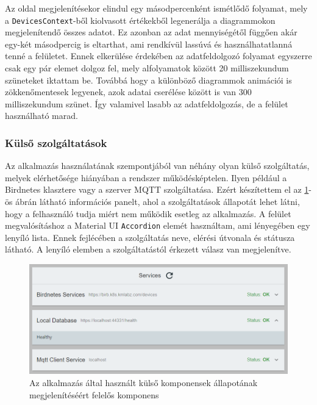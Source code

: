 Az oldal megjelenítésekor elindul egy másodpercenként ismétlődő folyamat,
mely a \verb+DevicesContext+-ből kiolvasott értékekből legenerálja a diagrammokon megjelenítendő összes adatot.
Ez azonban az adat mennyiségétől függően akár egy-két másodpercig is eltarthat, ami rendkívül lassúvá és használhatatlanná tenné a felületet.
Ennek elkerülése érdekében az adatfeldolgozó folyamat egyszerre csak egy pár elemet dolgoz fel, mely alfolyamatok között 20 milliszekundum szüneteket iktattam be.
Továbbá hogy a különböző diagrammok animációi is zökkenőmentesek legyenek, azok adatai cserélése között is van 300 milliszekundum szünet.
Így valamivel lasabb az adatfeldolgozás, de a felület használható marad.
\subsubsection{Külső szolgáltatások}
Az alkalmazás használatának szempontjából van néhány olyan külső szolgáltatás, melyek elérhetősége hiányában a rendszer működésképtelen.
Ilyen például a Birdnetes klasztere vagy a szerver MQTT szolgáltatása. 
Ezért készítettem el az \ref{fig:dashboard-services-loaded}-ös ábrán látható információs panelt, ahol a szolgáltatások állapotát lehet látni, hogy a felhasználó tudja miért nem működik esetleg az alkalmazás.
A felület megvalósításhoz a Material UI \verb+Accordion+ elemét használtam, ami lényegében egy lenyíló lista. 
Ennek fejlécében a szolgáltatás neve, elérési útvonala és státusza látható. A lenyíló elemben a szolgáltatástól érkezett válasz van megjelenítve. 

\begin{figure}[!ht]
    \centering
    \includegraphics[width=150mm, keepaspectratio]{figures/dashboard-services-loaded.png}
    \caption{Az alkalmazás által használt külső komponensek állapotának megjelenítéséért felelős komponens}
    \label{fig:dashboard-services-loaded}
\end{figure}

